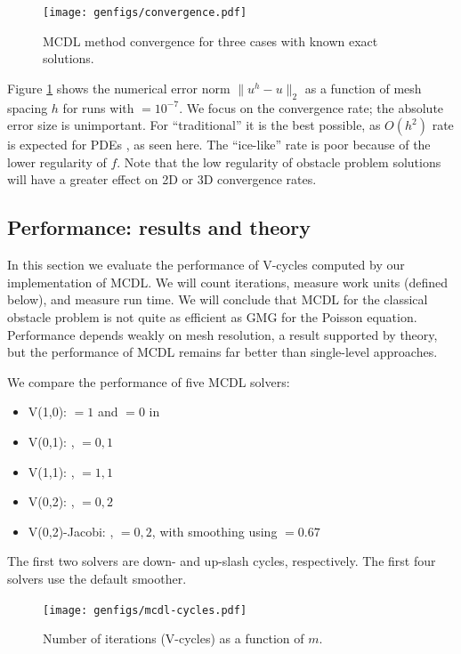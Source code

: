 \documentclass[letterpaper,final,12pt,reqno]{amsart}
\theoremstyle{claim}
\numberwithin{equation}{section}
\numberwithin{figure}{section}
\numberwithin{table}{section}
\numberwithin{theorem}{section}
\begin{document}
\begin{figure}
\texttt{[image: genfigs/convergence.pdf]}
\caption{MCDL method convergence for three cases with known exact solutions.}
\label{fig:convergence}
\end{figure}

Figure \ref{fig:convergence} shows the numerical error norm $\|u^h-u\|_2$ as a function of mesh spacing $h$ for runs with  $=10^{-7}$.  We focus on the convergence rate; the absolute error size is unimportant.  For ``traditional'' it is the best possible, as $O(h^2)$ rate is expected for PDEs \cite{Elmanetal2014}, as seen here.  The ``ice-like'' rate is poor because of the lower regularity of $f$.  Note that the low regularity of obstacle problem solutions will have a greater effect on 2D or 3D convergence rates.

\subsection{Performance: results and theory} \label{subsec:obstacleperformance}  In this section we evaluate the performance of V-cycles computed by our implementation of MCDL.  We will count iterations, measure work units (defined below), and measure run time.  We will conclude that MCDL for the classical obstacle problem is not quite as efficient as GMG for the Poisson equation.  Performance depends weakly on mesh resolution, a result supported by theory, but the performance of MCDL remains far better than single-level approaches.

We compare the performance of five MCDL solvers:
\begin{itemize}
\item \textsf{V(1,0)}:  $=1$ and  $=0$ in 
\item \textsf{V(0,1)}: ,  $=0,1$
\item \textsf{V(1,1)}: ,  $=1,1$
\item \textsf{V(0,2)}: ,  $=0,2$
\item \textsf{V(0,2)-Jacobi}: ,  $=0,2$, with  smoothing using  $=0.67$
\end{itemize}
The first two solvers are down- and up-slash cycles, respectively.  The first four solvers use the default  smoother.

\begin{figure}
\texttt{[image: genfigs/mcdl-cycles.pdf]}
\caption{Number of iterations (V-cycles) as a function of $m$.}
\label{fig:mcdl-cycles}
\end{figure}
\end{document}
